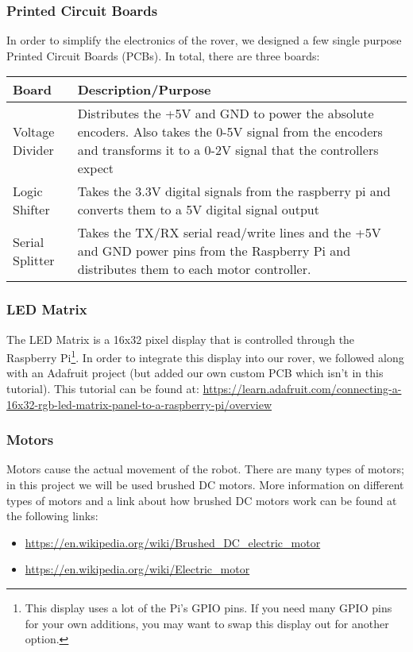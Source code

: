 \documentclass[12pt]{article}
\begin{document}
\subsubsection{Printed Circuit Boards}
In order to simplify the electronics of the rover, we designed a few single purpose Printed Circuit Boards (PCBs). In total, there are three boards:
\bigskip

\begin{tabular}[2]{| p{5cm} | p{10cm} | }
	\hline
	\textbf{Board} & \textbf{Description/Purpose} \\ \hline
	Voltage Divider & Distributes the +5V and GND to power the absolute encoders. Also takes the 0-5V signal from the encoders and transforms it to a 0-2V signal that the controllers expect \\ \hline
	Logic Shifter & Takes the 3.3V digital signals from the raspberry pi and converts them to a 5V digital signal output \\ \hline
	Serial Splitter & Takes the TX/RX serial read/write lines and the +5V and GND power pins from the Raspberry Pi and distributes them to each motor controller. \\ \hline
\end{tabular}
\bigskip

\subsubsection{LED Matrix}
The LED Matrix is a 16x32 pixel display that is controlled through the Raspberry Pi\footnote{This display uses a lot of the Pi's GPIO pins.  If you need many GPIO pins for your own additions, you may want to swap this display out for another option.}. In order to integrate this display into our rover, we followed along with an Adafruit project (but added our own custom PCB which isn't in this tutorial). This tutorial can be found at: \href{https://learn.adafruit.com/connecting-a-16x32-rgb-led-matrix-panel-to-a-raspberry-pi/overview}{https://learn.adafruit.com/connecting-a-16x32-rgb-led-matrix-panel-to-a-raspberry-pi/overview}

\subsubsection{Motors}
Motors cause the actual movement of the robot. There are many types of motors; in this project we will be used brushed DC motors. More information on different types of motors and a link about how brushed DC motors work can be found at the following links:
\begin{itemize}
	\item \href{https://en.wikipedia.org/wiki/Brushed_DC_electric_motor}{https://en.wikipedia.org/wiki/Brushed\_DC\_electric\_motor}
	\item \href{https://en.wikipedia.org/wiki/Electric_motor}{https://en.wikipedia.org/wiki/Electric\_motor}
\end{itemize}
\end{document}
